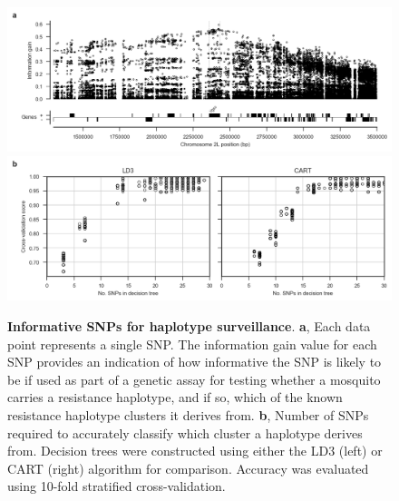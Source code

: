 \documentclass[a4paper,11pt,abstracton,hidelinks]{scrartcl}
\begin{document}
%
\begin{figure}[!t]
  \centering

  \includegraphics[width=1.0\linewidth]{artwork/info_gain.png}
  \includegraphics[width=1.0\linewidth]{artwork/tree_cv.png}

  \caption{%
%
\textbf{Informative SNPs for haplotype surveillance}.
%
\textbf{a}, Each data point represents a single SNP.
%
The information gain value for each SNP provides an indication of how informative the SNP is likely to be if used as part of a genetic assay for testing whether a mosquito carries a resistance haplotype, and if so, which of the known resistance haplotype clusters it derives from.
%
\textbf{b}, Number of SNPs required to accurately classify which cluster a haplotype derives from.
%
Decision trees were constructed using either the LD3 (left) or CART (right) algorithm for comparison.
%
Accuracy was evaluated using 10-fold stratified cross-validation.
}

  \label{fig:gain}
\end{figure}
\end{document}
